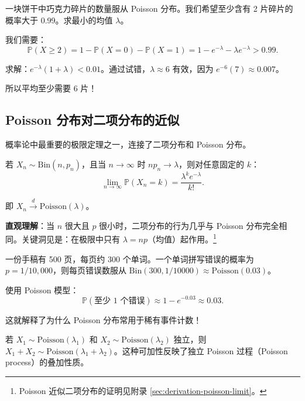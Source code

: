 \begin{example}[巧克力碎片]\label{ex:chocolate-chips-ch3}
一块饼干中巧克力碎片的数量服从 Poisson 分布。我们希望至少含有 2 片碎片的概率大于 0.99。求最小的均值 $\lambda$。

我们需要：
\[
\mathbb{P}(X \geq 2) = 1 - \mathbb{P}(X = 0) - \mathbb{P}(X = 1) = 1 - e^{-\lambda} - \lambda e^{-\lambda} > 0.99.
\]

求解：$e^{-\lambda}(1 + \lambda) < 0.01$。通过试错，$\lambda \approx 6$ 有效，因为 $e^{-6}(7) \approx 0.007$。

所以平均至少需要 6 片！
\end{example}

\subsection{Poisson 分布对二项分布的近似}\label{sub:poisson-approximation-ch3}

概率论中最重要的极限定理之一，连接了二项分布和 Poisson 分布。

\begin{theorem}\label{th:poisson-approximation-ch3}
若 $X_n \sim \text{Bin}(n, p_n)$，且当 $n \to \infty$ 时 $np_n \to \lambda$，则对任意固定的 $k$：
\[
\lim_{n \to \infty} \mathbb{P}(X_n = k) = \frac{\lambda^{k} e^{-\lambda}}{k!}.
\]

即 $X_n \xrightarrow{d} \text{Poisson}(\lambda)$。
\end{theorem}

\textbf{直观理解}：当 $n$ 很大且 $p$ 很小时，二项分布的行为几乎与 Poisson 分布完全相同。关键洞见是：在极限中只有 $\lambda = np$（均值）起作用。\footnote{Poisson 近似二项分布的证明见附录 \cref{sec:derivation-poisson-limit}。}

\begin{example}[印刷错误]\label{ex:poisson-errors-ch3}
一份手稿有 500 页，每页约 300 个单词。一个单词拼写错误的概率为 $p = 1/10{,}000$，则每页错误数服从 $\text{Bin}(300, 1/10000) \approx \text{Poisson}(0.03)$。

使用 Poisson 模型：
\[
\mathbb{P}(\text{至少 1 个错误}) \approx 1 - e^{-0.03} \approx 0.03.
\]

这就解释了为什么 Poisson 分布常用于稀有事件计数！
\end{example}

\begin{example}\label{rmk:poisson-additivity-ch3}
若 $X_1 \sim \text{Poisson}(\lambda_1)$ 和 $X_2 \sim \text{Poisson}(\lambda_2)$ 独立，则 $X_1 + X_2 \sim \text{Poisson}(\lambda_1 + \lambda_2)$。这种可加性反映了独立 Poisson 过程（Poisson process）的叠加性质。
\end{example}

